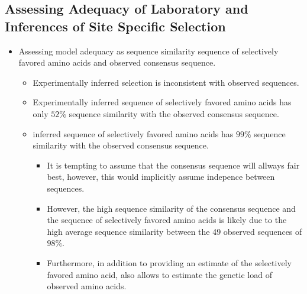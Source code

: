 \documentclass[12pt]{article}
\begin{document}
\subsection*{Assessing Adequacy of Laboratory and \selac Inferences of Site Specific Selection}
\begin{itemize}
	\item Assessing model adequacy as sequence similarity sequence of selectively favored amino acids and observed consensus sequence.
	\begin{itemize}
		\item Experimentally inferred selection is inconsistent with observed sequences.
		\item Experimentally inferred sequence of selectively favored amino acids has only $52 \%$ sequence similarity with the observed consensus sequence.
		\item \selac inferred sequence of selectively favored amino acids has $99 \%$ sequence similarity with the observed consensus sequence.
		\begin{itemize}
			\item It is tempting to assume that the consensus sequence will allways fair best, however, this would implicitly assume indepence between sequences.
			\item However, the high sequence similarity of the consensus sequence and the sequence of selectively favored amino acids is likely due to the high average sequence similarity between the 49 observed sequences of $98 \%$.
			\item Furthermore, in addition to providing an estimate of the selectively favored amino acid, \selac also allows to estimate the genetic load of observed amino acids.
		\end{itemize}
	\end{itemize}
\end{itemize}
\end{document}
